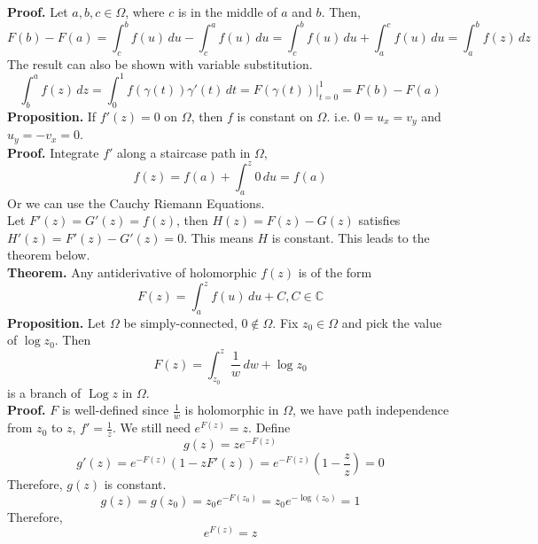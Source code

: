 \documentclass[11pt]{article}
\begin{document}
\textbf{Proof.} Let $a, b, c \in \Omega$, where $c$ is in the middle of $a$ and $b$. Then, \\
$$F(b) - F(a) = \int_c^b f(u) \,du - \int_c^a f(u) \,du = \int_c^b f(u) \,du + \int_a^c f(u) \,du = \int_a^b f(z) \,dz$$
The result can also be shown with variable substitution. 
$$ \int_b^a f(z) \,dz = \int_0^1 f(\gamma(t))\gamma'(t) \,dt = F(\gamma(t))\Big|_{t = 0}^{1} = F(b) - F(a)$$
\newline
\textbf{Proposition.} If $f'(z) = 0$ on $\Omega$, then $f$ is constant on $\Omega$. i.e. $0 = u_x = v_y$ and $u_y = -v_x = 0$. \\
\textbf{Proof.} Integrate $f'$ along a staircase path in $\Omega$, 
$$f(z) = f(a) + \int_a^z 0 \, du = f(a)$$
Or we can use the Cauchy Riemann Equations.\\
\newline
Let $F'(z) = G'(z) = f(z)$, then $H(z) = F(z) - G(z)$ satisfies $H'(z) = F'(z) - G'(z) = 0$. This means $H$ is constant. This leads to the theorem below.  \\
\newline
\textbf{Theorem.} Any antiderivative of holomorphic $f(z)$ is of the form 
$$F(z) = \int_a^z f(u) \, du + C, C \in \mathbb{C}$$ 
\newline
\textbf{Proposition.} Let $\Omega$ be simply-connected, $0 \notin \Omega$. Fix $z_0 \in \Omega$ and pick the value of $\operatorname{log}z_0$. Then 
$$F(z) = \int_{z_0}^z \frac{1}{w} \,dw + \operatorname{log} z_0$$
is a branch of $\operatorname{Log} z $ in $\Omega$.\\
\textbf{Proof.} $F$ is well-defined since $\frac{1}{w}$ is holomorphic in $\Omega$, we have path independence from $z_0$ to $z$, $f' = \frac{1}{z}$. 
We still need $e^{F(z)} = z$.
Define 
$$g(z) = ze^{-F(z)}$$
$$g'(z) = e^{-F(z)}(1 - zF'(z)) = e^{-F(z)}(1 - \frac{z}{z}) = 0$$
Therefore, $g(z)$ is constant. 
$$g(z) = g(z_0) = z_0e^{-F(z_0)} = z_0 e^{-\operatorname{log}(z_0)} = 1$$
Therefore, 
$$e^{F(z)} = z$$

\newpage
\end{document}
